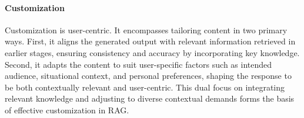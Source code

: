\paragraph{Customization}
Customization is user-centric. It encompasses tailoring content in two primary ways. First, it aligns the generated output with relevant information retrieved in earlier stages, ensuring consistency and accuracy by incorporating key knowledge. Second, it adapts the content to suit user-specific factors such as intended audience, situational context, and personal preferences, shaping the response to be both contextually relevant and user-centric. This dual focus on integrating relevant knowledge and adjusting to diverse contextual demands forms the basis of effective customization in RAG.